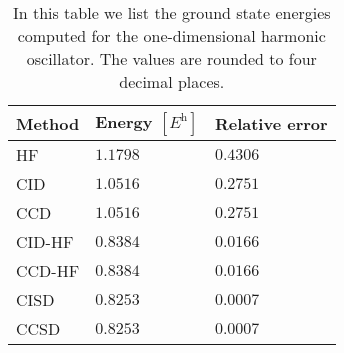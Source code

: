         \begin{table}
            \centering
            \caption{In this table we list the ground state energies computed
            for the one-dimensional harmonic oscillator.
            The values are rounded to four decimal places.}
            \renewcommand{\arraystretch}{1.3}
            \begin{tabular}{@{}lll@{}}
                \toprule
                Method & Energy $[\si{\hartree}]$
                & Relative error \\
                \midrule
                HF     & $1.1798$ & $0.4306$ \\
                CID    & $1.0516$ & $0.2751$ \\
                CCD    & $1.0516$ & $0.2751$ \\
                CID-HF & $0.8384$ & $0.0166$ \\
                CCD-HF & $0.8384$ & $0.0166$ \\
                CISD   & $0.8253$ & $0.0007$ \\
                CCSD   & $0.8253$ & $0.0007$ \\
                \bottomrule
            \end{tabular}
            \label{tab:gs-zanghellini}
        \end{table}

